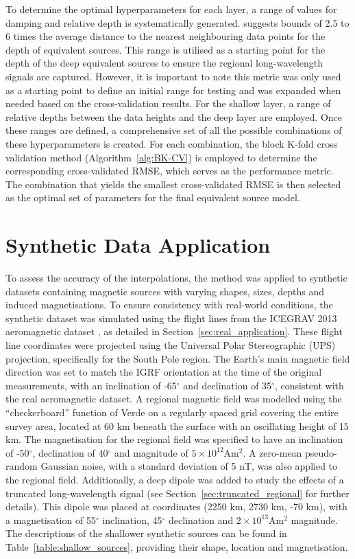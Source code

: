 To determine the optimal hyperparameters for each layer, a range of values for damping and relative depth is systematically generated. \citet{Dampney1969} suggests bounds of 2.5 to 6 times the average distance to the nearest neighbouring data points for the depth of equivalent sources. This range is utilised as a starting point for the depth of the deep equivalent sources to ensure the regional long-wavelength signals are captured. However, it is important to note this metric was only used as a starting point to define an initial range for testing and was expanded when needed based on the cross-validation results. For the shallow layer, a range of relative depths between the data heights and the deep layer are employed. Once these ranges are defined, a comprehensive set of all the possible combinations of these hyperparameters is created. For each combination, the block K-fold cross validation method (Algorithm~\ref{alg:BK-CV}) is employed to determine the corresponding cross-validated RMSE, which serves as the performance metric. The combination that yields the smallest cross-validated RMSE is then selected as the optimal set of parameters for the final equivalent source model.


\section{Synthetic Data Application}

To assess the accuracy of the interpolations, the method was applied to synthetic datasets containing magnetic sources with varying shapes, sizes, depths and induced magnetisations. To ensure consistency with real-world conditions, the synthetic dataset was simulated using the flight lines from the ICEGRAV 2013 aeromagnetic dataset \citep{ICEGRAV_data}, as detailed in Section~\ref{sec:real_application}. These flight line coordinates were projected using the Universal Polar Stereographic (UPS) projection, specifically for the South Pole region. The Earth's main magnetic field direction was set to match the IGRF orientation at the time of the original measurements, with an inclination of -65$^\circ$ and declination of 35$^\circ$, consistent with the real aeromagnetic dataset. A regional magnetic field was modelled using the ``checkerboard'' function of Verde  \citep{verde} on a regularly spaced grid covering the entire survey area, located at 60 km beneath the surface with an oscillating height of 15 km. The magnetisation for the regional field was specified to have an inclination of -50$^\circ$, declination of 40$^\circ$ and magnitude of $5 \times 10^{12}$Am$^2$. A zero-mean pseudo-random Gaussian noise, with a standard deviation of 5 nT, was also applied to the regional field. Additionally, a deep dipole was added to study the effects of a truncated long-wavelength signal (see Section~\ref{sec:truncated_regional} for further details). This dipole was placed at coordinates (2250 km, 2730 km, -70 km), with a magnetisation of 55$^\circ$ inclination, 45$^\circ$ declination and $2 \times 10^{13}$Am$^2$ magnitude. The descriptions of the shallower synthetic sources can be found in Table~\ref{table:shallow_sources}, providing their shape, location and magnetisation.


